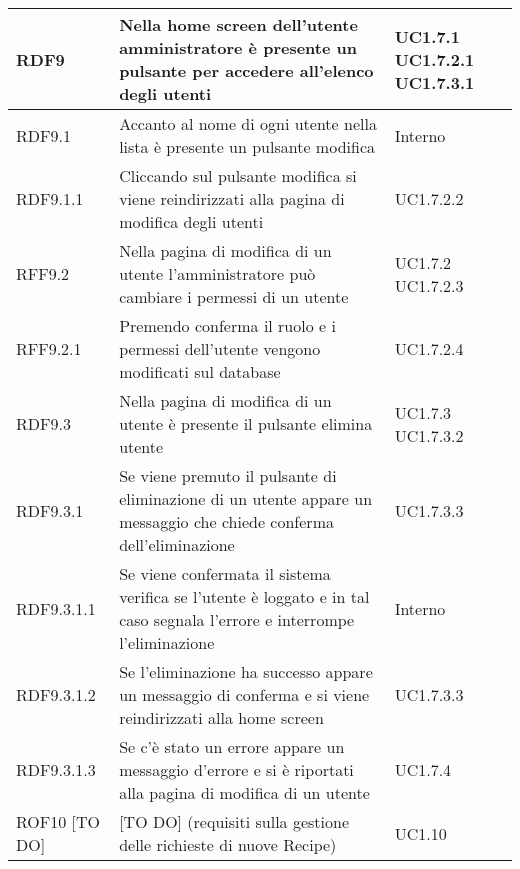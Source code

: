 \begin{center}
\begin{longtable}{| p{2cm} | p{8cm} | p{2cm} |}
		RDF9 & Nella home screen dell'utente amministratore è presente un pulsante per accedere all'elenco degli utenti  &  UC1.7.1 \newline UC1.7.2.1 \newline UC1.7.3.1 \\
		\hline
		RDF9.1  &  Accanto al nome di ogni utente nella lista è presente un pulsante modifica  &  Interno \\
		\hline
		RDF9.1.1  &  Cliccando sul pulsante modifica si viene reindirizzati alla pagina di modifica degli utenti  &  UC1.7.2.2 \\
		\hline
		RFF9.2  &  Nella pagina di modifica di un utente l'amministratore può cambiare i permessi di un utente  &  UC1.7.2 \newline UC1.7.2.3 \\
		\hline
		RFF9.2.1  &  Premendo conferma il ruolo e i permessi dell'utente vengono modificati sul database  &  UC1.7.2.4 \\
		\hline
		RDF9.3  &  Nella pagina di modifica di un utente è presente il pulsante elimina utente  &  UC1.7.3 \newline UC1.7.3.2 \\
		\hline
		RDF9.3.1  &  Se viene premuto il pulsante di eliminazione di un utente appare un messaggio che chiede conferma dell'eliminazione  & UC1.7.3.3\\
		\hline
		RDF9.3.1.1  &  Se viene confermata il sistema verifica se l'utente è loggato e in tal caso segnala l'errore e interrompe l'eliminazione  & Interno \\
		\hline
		RDF9.3.1.2  &  Se l'eliminazione ha successo appare un messaggio di conferma e si viene reindirizzati alla home screen  & UC1.7.3.3\\
		\hline
		RDF9.3.1.3  &  Se c'è stato un errore appare un messaggio d'errore e si è riportati alla pagina di modifica di un utente  & UC1.7.4\\
		\hline



		ROF10 [TO DO] &  [TO DO] (requisiti sulla gestione delle richieste di nuove Recipe)  & UC1.10 \\
		\hline




\end{longtable}
\end{center}
